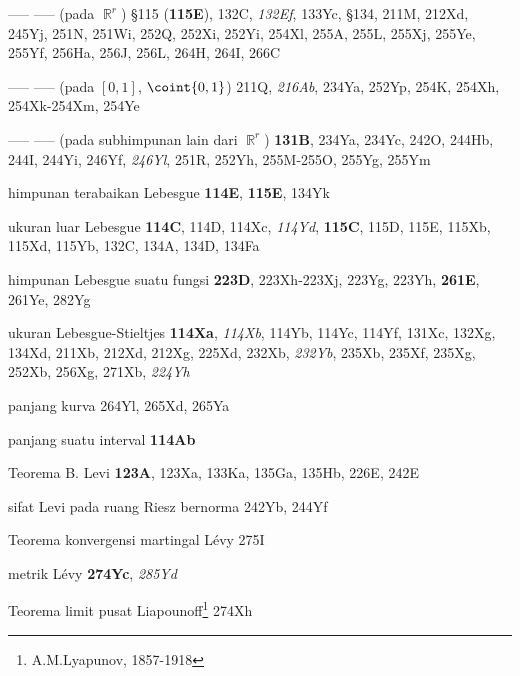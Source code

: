 ----- ----- (pada $\BbbR^r$) \S115 ({\bf 115E}), 132C, {\it 132Ef}, 133Yc,
\S134,
  211M,  212Xd, 245Yj, 251N, 251Wi, 252Q, 252Xi, 252Yi, 254Xl,
  255A, 255L, 255Xj, 255Ye, 255Yf, 256Ha, 256J, 256L,
264H, 264I, 266C


----- ----- (pada $[0,1]$, $\coint{0,1}$) 211Q, {\it 216Ab},
234Ya, 252Yp, 254K, 254Xh, 254Xk-254Xm, 
254Ye


----- ----- (pada subhimpunan lain dari $\BbbR^r$) {\bf 131B},
  234Ya, 234Yc, 242O, 244Hb, 244I, 244Yi,
246Yf, {\it 246Yl},
251R, 252Yh, 255M-255O, 
255Yg, 255Ym





himpunan terabaikan Lebesgue {\bf 114E}, {\bf 115E}, 134Yk



ukuran luar Lebesgue {\bf 114C}, 114D, 114Xc, {\it 114Yd}, {\bf
115C}, 115D, 115E, 115Xb, 115Xd, 115Yb, 132C, 134A, 134D, 134Fa

himpunan Lebesgue suatu fungsi {\bf 223D},
223Xh-223Xj, 
223Yg, 223Yh, {\bf 261E}, 261Ye, 282Yg


ukuran Lebesgue-Stieltjes {\bf 114Xa}, {\it 114Xb},
114Yb, 114Yc, 114Yf, 131Xc, 132Xg, 134Xd,
  211Xb, 212Xd, 212Xg, 225Xd, 232Xb, {\it 232Yb}, 235Xb, 235Xf, 235Xg,
252Xb, 256Xg, 271Xb, {\it 224Yh}











panjang kurva 264Yl, 265Xd, 265Ya




panjang suatu interval {\bf 114Ab}




Teorema B. Levi {\bf 123A}, 123Xa, 133Ka, 135Ga, 135Hb,
  226E, 242E

sifat Levi pada ruang Riesz bernorma 242Yb, 244Yf








Teorema konvergensi martingal L\'evy 275I


metrik L\'evy {\bf 274Yc}, {\it 285Yd}






Teorema limit pusat Liapounoff\footnote{A.M.Lyapunov, 1857-1918}
274Xh






